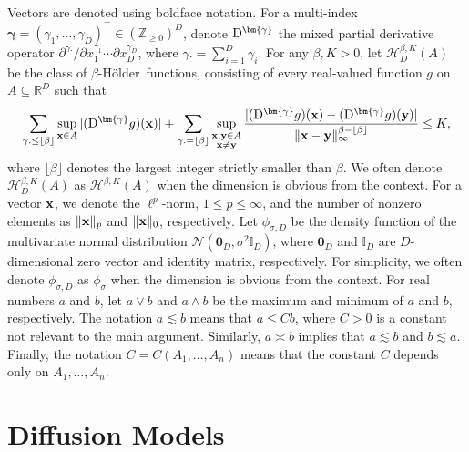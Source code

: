 \documentclass[twoside,11pt]{article}
\def\cH{\mathcal H}
\def\cN{\mathcal N}
\newcommand{\bx}{{\bf x}}
\newcommand{\by}{{\bf y}}
\newcommand{\bbI}{{\mathbb I}}
\newcommand{\bbR}{{\mathbb R}}
\newcommand{\bbZ}{{\mathbb Z}}
\newcommand{\bgamma}{\bm{\gamma}}
\newcommand{\Holder}{H\"{o}lder}
\newcommand{\bean}{\setlength\arraycolsep{1pt}\begin{eqnarray*}}
\newcommand{\eean}{\end{eqnarray*}}
\def\D{{\rm D}}
\begin{document}
Vectors are denoted using boldface notation.
For a multi-index $\bgamma = (\gamma_1,\ldots,\gamma_D)^{\top} %
\in (\bbZ_{\geq 0})^{D}$, denote $\D^{\bgamma}$ the mixed partial derivative operator $\partial^{\gamma.} / \partial x_1^{\gamma_1} \cdots \partial x_{D}^{\gamma_D}$, where $\gamma. = \sum_{i=1}^{D} \gamma_i$.
For any $\beta, K > 0$, let $\cH^{\beta, K}_{D}(A)$ be the class of $\beta$-\Holder\ functions, consisting of every real-valued function $g$ on $A \subseteq \bbR^{D}$ such that 
\bean
\sum_{\gamma. \leq \lfloor \beta \rfloor} \sup_{\bx \in A} \vert (\D^{\bgamma} g) (\bx) \vert + \sum_{\gamma. = \lfloor \beta \rfloor} \sup_{\substack{\bx,\by \in A \\ \bx \neq \by}} \frac{\vert (\D^{\bgamma} g)(\bx) - (\D^{\bgamma} g)(\by) \vert}{\| \bx-\by\|_{\infty}^{\beta - \lfloor \beta \rfloor}} \leq K,
\eean
where $\lfloor \beta \rfloor$ denotes the largest integer strictly smaller than $\beta$.
We often denote $\cH^{\beta,K}_{D}(A)$ as $\cH^{\beta,K}(A)$ when the dimension is obvious from the context.
For a vector $\bx$, we denote the $\ell^{p}$-norm, $1 \leq p \leq \infty$, and the number of nonzero elements as $\|\bx\|_{p}$ and $\|\bx\|_{0}$, respectively.
Let $\phi_{\sigma, D}$ be the density function of the multivariate normal distribution $\cN(\bm{0}_D, \sigma^2 \bbI_D )$, where $\bm{0}_D$ and $\bbI_D$ are $D$-dimensional zero vector and identity matrix, respectively.
 For simplicity, we often denote $\phi_{\sigma, D}$ as $\phi_\sigma$ when the dimension is obvious from the context.
For real numbers $a$ and $b$, let $a \vee b$ and $a \wedge b $ be the maximum and minimum of $a$ and $b$, respectively.
The notation $a \lesssim b$ means that $a \leq C b$, where $C > 0$ is a constant not relevant to the main argument.
Similarly, $a \asymp b$ implies that $a \lesssim b$ and $b \lesssim a$. 
Finally, the notation $C=C(A_1, \ldots, A_n)$ means that the constant $C$ depends only on $A_1, \ldots, A_n$.



\section{Diffusion Models}
\label{sec:model}
\end{document}
